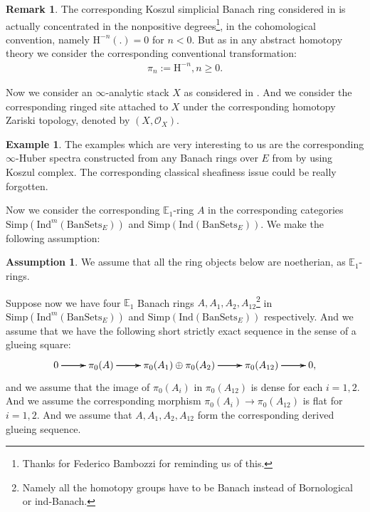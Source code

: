 \documentclass[12pt]{amsart}
\theoremstyle{definition}
\newtheorem{remark}[theorem]{Remark}
\numberwithin{equation}{section}
\newtheorem{example}[theorem]{Example}
\newtheorem{assumption}[theorem]{Assumption}
\begin{document}
\begin{remark}
The corresponding Koszul simplicial Banach ring considered in \cite{BK} is actually concentrated in the nonpositive degrees\footnote{Thanks for Federico Bambozzi for reminding us of this.}, in the cohomological convention, namely $\mathrm{H}^{-n}(.)=0$ for $n<0$. But as in any abstract homotopy theory we consider the corresponding conventional transformation:
\begin{align}
\pi_n:=	\mathrm{H}^{-n},n\geq 0.
\end{align} 	
\end{remark}


\indent Now we consider an $\infty$-analytic stack $X$ as considered in \cite{BBBK}. And we consider the corresponding ringed site attached to $X$ under the corresponding homotopy Zariski topology, denoted by $(X,\mathcal{O}_X)$.

\begin{example}
The examples which are very interesting to us are the corresponding $\infty$-Huber spectra constructed from any Banach rings over $E$ from \cite{BK} by using Koszul complex. The corresponding classical sheafiness issue could be really forgotten.	
\end{example}


\indent Now we consider the corresponding $\mathbb{E}_1$-ring $A$ in the corresponding categories $\mathrm{Simp}(\mathrm{Ind}^m(\mathrm{BanSets}_{E}))$ and $\mathrm{Simp}(\mathrm{Ind}(\mathrm{BanSets}_{E}))$. We make the following assumption:

\begin{assumption}
We assume that all the ring objects below are noetherian, as $\mathbb{E}_1$-rings.  	
\end{assumption}


\indent Suppose now we have four $\mathbb{E}_1$ Banach rings $A,A_1,A_2,A_{12}$\footnote{Namely all the homotopy groups have to be Banach instead of Bornological or ind-Banach.} in $\mathrm{Simp}(\mathrm{Ind}^m(\mathrm{BanSets}_{E}))$ and $\mathrm{Simp}(\mathrm{Ind}(\mathrm{BanSets}_{E}))$ respectively. And we assume that we have the following short strictly exact sequence in the sense of a glueing square:
\[
\xymatrix@C+0pc@R+0pc{
0 \ar[r] \ar[r] \ar[r] &\pi_0(A) \ar[r] \ar[r] \ar[r] &\pi_0(A_1)\oplus \pi_0(A_2)  \ar[r] \ar[r] \ar[r] &\pi_0(A_{12}) \ar[r] \ar[r] \ar[r] &0 ,   
}
\]
and we assume that the image of $\pi_0(A_i)$ in $\pi_0(A_{12}) $ is dense for each $i=1,2$. And we assume the corresponding morphism $\pi_0(A_i)\rightarrow \pi_0(A_{12})$ is flat for $i=1,2$. And we assume that $A,A_1,A_2,A_{12}$ form the corresponding derived glueing sequence.
\end{document}
